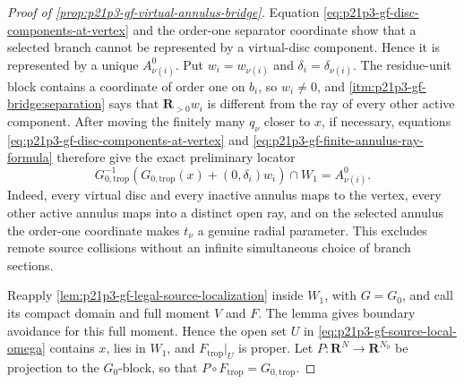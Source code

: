 \begin{proof}[Proof of
\cref{prop:p21p3-gf-virtual-annulus-bridge}]
Equation \eqref{eq:p21p3-gf-disc-components-at-vertex} and the order-one
separator coordinate show that a selected branch cannot be represented by a
virtual-disc component.  Hence it is represented by a unique
\(A_{\nu(i)}^0\).  Put \(w_i=w_{\nu(i)}\) and
\(\delta_i=\delta_{\nu(i)}\).  The residue-unit block contains a coordinate
of order one on \(b_i\), so \(w_i\ne0\), and
\cref{itm:p21p3-gf-bridge:separation} says that
\(\mathbf R_{>0}w_i\) is different from the ray of every other active
component.  After moving the finitely many \(q_\nu\) closer to \(x\), if
necessary, equations \eqref{eq:p21p3-gf-disc-components-at-vertex} and
\eqref{eq:p21p3-gf-finite-annulus-ray-formula} therefore give the exact
preliminary locator
\begin{equation}
 G_{0,\mathrm{trop}}^{-1}\!\left(
 G_{0,\mathrm{trop}}(x)+(0,\delta_i)w_i\right)\cap W_1
 = A_{\nu(i)}^0.
\end{equation}
Indeed, every virtual disc and every inactive annulus maps to the vertex,
every other active annulus maps into a distinct open ray, and on the selected
annulus the order-one coordinate makes \(t_\nu\) a genuine radial parameter.
This excludes remote source collisions without an infinite simultaneous
choice of branch sections.

Reapply \cref{lem:p21p3-gf-legal-source-localization} inside \(W_1\), with
\(G=G_0\), and call its compact domain and full moment \(V\) and \(F\).  The
lemma gives boundary avoidance for this full moment.  Hence the open set
\(U\) in \eqref{eq:p21p3-gf-source-local-omega} contains \(x\), lies in
\(W_1\), and \(F_{\mathrm{trop}}|_U\) is proper.  Let
\(P:\mathbf R^N\to\mathbf R^{N_0}\) be projection to the \(G_0\)-block, so
that \(P\circ F_{\mathrm{trop}}=G_{0,\mathrm{trop}}\).


\end{proof}
